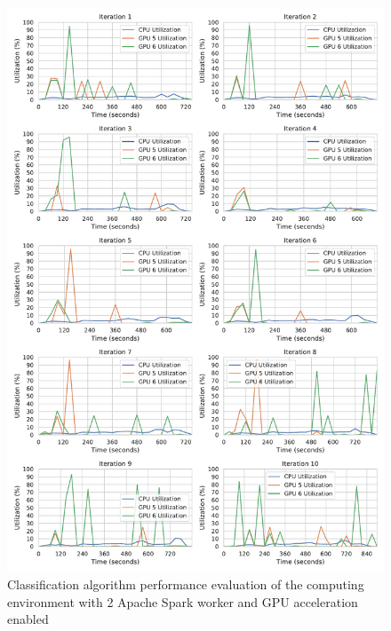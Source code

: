 \begin{figure}[h]
\centering
\includegraphics[scale=0.4]{images/07_evaluation/mortgage/mortgage_gpu2_performance}
\caption{Classification algorithm performance evaluation of the computing environment with 2 Apache Spark worker and GPU acceleration enabled}
\label{fig:07_mortgage_static-cpu_results}
\end{figure}

